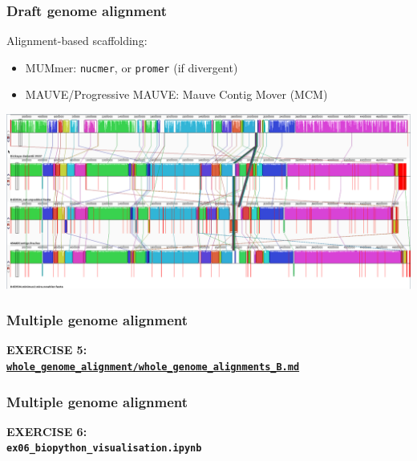 %
\begin{frame}
  \frametitle{Draft genome alignment}
  Alignment-based scaffolding:
  \begin{itemize}
    \item \textcolor{hutton_blue}{MUMmer}: \texttt{nucmer}, or \texttt{promer} (if divergent)
    \item \textcolor{hutton_purple}{MAUVE/Progressive MAUVE}: Mauve Contig Mover (MCM)
  \end{itemize}
  \begin{center}
    \includegraphics[width=\textwidth]{images/mauve_scaffolding}
  \end{center}    
\end{frame}

%
\begin{frame}
  \frametitle{Multiple genome alignment}
  \Large{
    \textcolor{hutton_blue}{
      \textbf{
      EXERCISE 5: \\
      {\small \href{https://github.com/widdowquinn/Teaching-2015-03-17-UoD_compgenvis/blob/master/exercises/whole_genome_alignment/whole_genome_alignments_B.md}{\texttt{whole\_genome\_alignment/whole\_genome\_alignments\_B.md}}}
      }
    }
  }
\end{frame}

%
\begin{frame}
  \frametitle{Multiple genome alignment}
  \Large{
    \textcolor{hutton_blue}{
      \textbf{
      EXERCISE 6: \\
      \texttt{ex06_biopython_visualisation.ipynb}
      }
    }
  }
\end{frame}